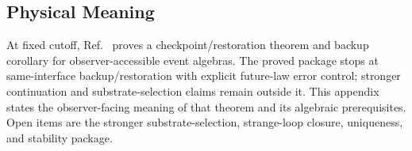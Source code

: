 \subsection{Physical Meaning}

At fixed cutoff, Ref.~\cite{ophmicrophysics} proves a checkpoint/restoration theorem and backup
corollary for observer-accessible event algebras. The proved package stops at same-interface
backup/restoration with explicit future-law error control; stronger continuation and
substrate-selection claims remain outside it. This appendix states the observer-facing meaning
of that theorem and its algebraic prerequisites. Open items are the stronger substrate-selection,
strange-loop closure, uniqueness, and stability package.


